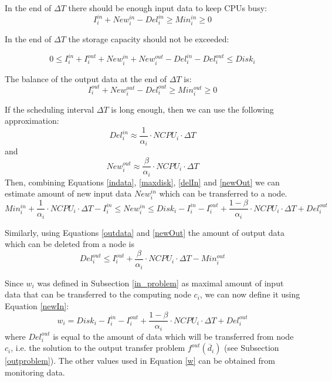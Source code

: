 \documentclass[english]{ddny}
\begin{document}
In the end of $\Delta T$ there should be enough input data to keep CPUs busy:
\begin{equation}
I_{i}^{in} + New_{i}^{in} - Del_{i}^{in} \geq Min_{i}^{in} \geq 0
\label{indata}
\end{equation}

In the end of $\Delta T$ the storage capacity should not be exceeded:

\begin{equation}
0 \leq I_{i}^{in} + I_{i}^{out} + New_{i}^{in} + New_{i}^{out} - Del_{i}^{in} - Del_{i}^{out} \leq Disk_{i}
\label{maxdisk}
\end{equation}

The balance of the output data at the end of $\Delta T$ is:
\begin{equation}
I_{i}^{out} + New_{i}^{out} - Del_{i}^{out} \geq Min_{i}^{out} \geq 0
\label{outdata}
\end{equation}

If the scheduling interval $\Delta T$ is long enough, then we can use the following approximation:
\begin{equation}
Del_{i}^{in} \approx \frac{1}{\alpha_{i}} \cdot NCPU_{i} \cdot \Delta T
\label{delIn}
\end{equation}
and
\begin{equation}
New_{i}^{out} \approx \frac{\beta}{\alpha_{i}} \cdot NCPU_{i} \cdot \Delta T
\label{newOut}
\end{equation}
Then, combining Equations \ref{indata}, \ref{maxdisk}, \ref{delIn} and \ref{newOut} we can estimate amount of new input data $New_{i}^{in}$ which can be transferred to a node.
\begin{equation}
Min_{i}^{in} + \frac{1}{\alpha_{i}} \cdot NCPU_{i} \cdot \Delta T - I_{i}^{in} 
\leq New_{i}^{in} \leq
Disk_{i} - I_{i}^{in} - I_{i}^{out} + \frac{1 - \beta}{\alpha_{i}} \cdot NCPU_{i} \cdot \Delta T + Del_{i}^{out}
\label{newIn}
\end{equation}

Similarly, using Equations \ref{outdata} and \ref{newOut} the amount of output data which can be deleted from a node is
\begin{equation}
\label{delOut}
Del_{i}^{out} \leq I_{i}^{out} + \frac{\beta}{\alpha_{i}} \cdot NCPU_{i} \cdot \Delta T - Min_{i}^{out}
\end{equation}  

Since $w_{i}$ was defined in Subsection \ref{in_problem} as maximal amount of input data that can be transferred to the computing node $c_{i}$, we can now define it using Equation \ref{newIn}:
\begin{equation}
w_{i} =
Disk_{i} - I_{i}^{in} - I_{i}^{out} + \frac{1 - \beta}{\alpha_{i}} \cdot NCPU_{i} \cdot \Delta T + Del_{i}^{out}
\label{w}
\end{equation}
where $Del_{i}^{out}$ is equal to the amount of data which will be transferred from node $c_{i}$, i.e. the solution to the output transfer problem $f^{out}(\overline{d}_{i})$ (see Subsection \ref{outproblem}). The other values used in Equation \ref{w} can be obtained from monitoring data.
\end{document}
